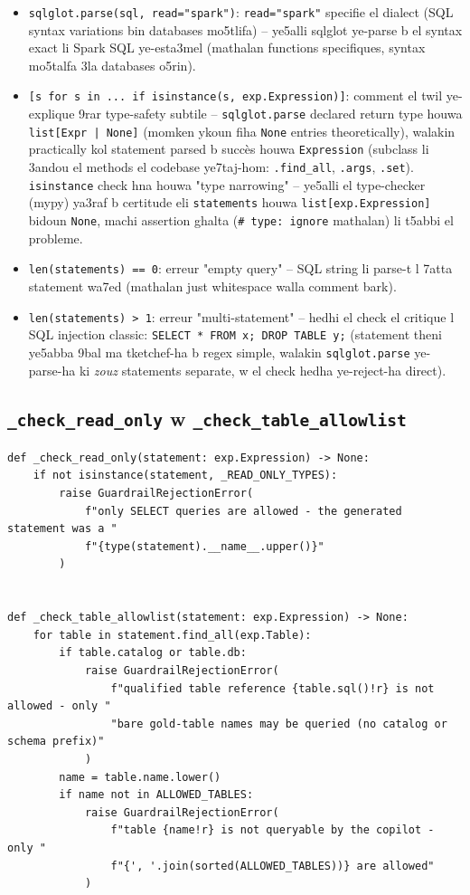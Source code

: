 \documentclass[11pt,a4paper]{report}
\DeclareRobustCommand{\code}[1]{\texttt{#1}}
\begin{document}
\begin{itemize}
  \item \code{sqlglot.parse(sql, read="spark")}: \code{read="spark"}
        specifie el dialect (SQL syntax variations bin databases mo5tlifa)
        -- ye5alli sqlglot ye-parse b el syntax exact li Spark SQL
        ye-esta3mel (mathalan functions specifiques, syntax mo5talfa 3la
        databases o5rin).
  \item \code{[s for s in ... if isinstance(s, exp.Expression)]}: comment
        el twil ye-explique 9rar type-safety subtile -- \code{sqlglot.parse}
        declared return type houwa \code{list[Expr | None]} (momken
        ykoun fiha \code{None} entries theoretically), walakin practically
        kol statement parsed b succès houwa \code{Expression} (subclass
        li 3andou el methods el codebase ye7taj-hom: \code{.find\_all},
        \code{.args}, \code{.set}). \code{isinstance} check hna houwa
        "type narrowing" -- ye5alli el type-checker (mypy) ya3raf b
        certitude eli \code{statements} houwa \code{list[exp.Expression]}
        bidoun \code{None}, machi assertion ghalta (\code{\# type: ignore}
        mathalan) li t5abbi el probleme.
  \item \code{len(statements) == 0}: erreur "empty query" -- SQL string
        li parse-t l 7atta statement wa7ed (mathalan just whitespace
        walla comment bark).
  \item \code{len(statements) > 1}: erreur "multi-statement" -- hedhi
        el check el critique l SQL injection classic: \code{SELECT * FROM
        x; DROP TABLE y;} (statement theni ye5abba 9bal ma tketchef-ha
        b regex simple, walakin \code{sqlglot.parse} ye-parse-ha ki
        \emph{zouz} statements separate, w el check hedha ye-reject-ha
        direct).
\end{itemize}

\subsection{\code{\_check\_read\_only} w \code{\_check\_table\_allowlist}}

\begin{lstlisting}[style=pystyle]
def _check_read_only(statement: exp.Expression) -> None:
    if not isinstance(statement, _READ_ONLY_TYPES):
        raise GuardrailRejectionError(
            f"only SELECT queries are allowed - the generated statement was a "
            f"{type(statement).__name__.upper()}"
        )


def _check_table_allowlist(statement: exp.Expression) -> None:
    for table in statement.find_all(exp.Table):
        if table.catalog or table.db:
            raise GuardrailRejectionError(
                f"qualified table reference {table.sql()!r} is not allowed - only "
                "bare gold-table names may be queried (no catalog or schema prefix)"
            )
        name = table.name.lower()
        if name not in ALLOWED_TABLES:
            raise GuardrailRejectionError(
                f"table {name!r} is not queryable by the copilot - only "
                f"{', '.join(sorted(ALLOWED_TABLES))} are allowed"
            )
\end{lstlisting}
\end{document}
